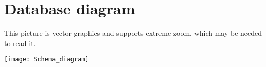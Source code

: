 \chapter{Database diagram}
\label{app:database diagram}
This picture is vector graphics and supports extreme zoom, which may be needed
to read it.

\texttt{[image: Schema\_diagram]}